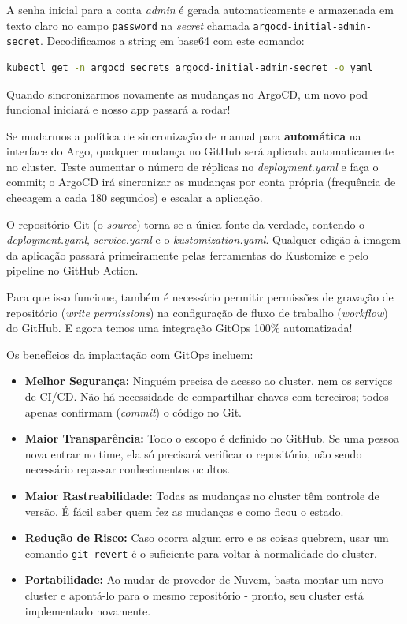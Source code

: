 \documentclass[11pt,a4paper]{article}
\begin{document}
A senha inicial para a conta \textit{admin} é gerada automaticamente e armazenada em texto claro no campo \texttt{password} na \textit{secret} chamada \texttt{argocd-initial-admin-secret}. Decodificamos a string em base64 com este comando:
\begin{lstlisting}[language=bash]
kubectl get -n argocd secrets argocd-initial-admin-secret -o yaml
\end{lstlisting}

Quando sincronizarmos novamente as mudanças no ArgoCD, um novo pod funcional iniciará e nosso app passará a rodar!

Se mudarmos a política de sincronização de manual para \textbf{automática} na interface do Argo, qualquer mudança no GitHub será aplicada automaticamente no cluster. Teste aumentar o número de réplicas no \textit{deployment.yaml} e faça o commit; o ArgoCD irá sincronizar as mudanças por conta própria (frequência de checagem a cada 180 segundos) e escalar a aplicação.

O repositório Git (o \textit{source}) torna-se a única fonte da verdade, contendo o \textit{deployment.yaml}, \textit{service.yaml} e o \textit{kustomization.yaml}. Qualquer edição à imagem da aplicação passará primeiramente pelas ferramentas do Kustomize e pelo pipeline no GitHub Action.

Para que isso funcione, também é necessário permitir permissões de gravação de repositório (\textit{write permissions}) na configuração de fluxo de trabalho (\textit{workflow}) do GitHub. E agora temos uma integração GitOps 100\% automatizada!

Os benefícios da implantação com GitOps incluem:
\begin{itemize}
    \item \textbf{Melhor Segurança:} Ninguém precisa de acesso ao cluster, nem os serviços de CI/CD. Não há necessidade de compartilhar chaves com terceiros; todos apenas confirmam (\textit{commit}) o código no Git.
    \item \textbf{Maior Transparência:} Todo o escopo é definido no GitHub. Se uma pessoa nova entrar no time, ela só precisará verificar o repositório, não sendo necessário repassar conhecimentos ocultos.
    \item \textbf{Maior Rastreabilidade:} Todas as mudanças no cluster têm controle de versão. É fácil saber quem fez as mudanças e como ficou o estado.
    \item \textbf{Redução de Risco:} Caso ocorra algum erro e as coisas quebrem, usar um comando \texttt{git revert} é o suficiente para voltar à normalidade do cluster.
    \item \textbf{Portabilidade:} Ao mudar de provedor de Nuvem, basta montar um novo cluster e apontá-lo para o mesmo repositório - pronto, seu cluster está implementado novamente.
\end{itemize}
\end{document}
